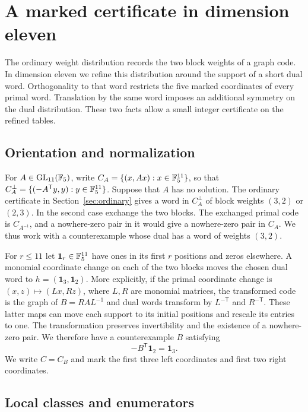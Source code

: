 \section{A marked certificate in dimension eleven}
\label{sec:marked}

The ordinary weight distribution records the two block weights of a graph code. In dimension eleven we refine this distribution around the support of a short dual word. Orthogonality to that word restricts the five marked coordinates of every primal word. Translation by the same word imposes an additional symmetry on the dual distribution. These two facts allow a small integer certificate on the refined tables.

\subsection{Orientation and normalization}

For \(A\in\operatorname{GL}_{11}(\mathbb F_5)\), write \(C_A=\{(x,Ax):x\in\mathbb F_5^{11}\}\), so that \(C_A^\perp=\{(-A^{\mathsf T}y,y):y\in\mathbb F_5^{11}\}\). Suppose that \(A\) has no solution. The ordinary certificate in Section~\ref{sec:ordinary} gives a word in \(C_A^\perp\) of block weights \((3,2)\) or \((2,3)\). In the second case exchange the two blocks. The exchanged primal code is \(C_{A^{-1}}\), and a nowhere-zero pair in it would give a nowhere-zero pair in \(C_A\). We thus work with a counterexample whose dual has a word of weights \((3,2)\).

For \(r\le 11\) let \(\mathbf 1_r\in\mathbb F_5^{11}\) have ones in its first \(r\) positions and zeros elsewhere. A monomial coordinate change on each of the two blocks moves the chosen dual word to \(h=(\mathbf 1_3,\mathbf 1_2)\). More explicitly, if the primal coordinate change is \((x,z)\mapsto(Lx,Rz)\), where \(L,R\) are monomial matrices, the transformed code is the graph of \(B=RAL^{-1}\) and dual words transform by \(L^{-\mathsf T}\) and \(R^{-\mathsf T}\). These latter maps can move each support to its initial positions and rescale its entries to one. The transformation preserves invertibility and the existence of a nowhere-zero pair. We therefore have a counterexample \(B\) satisfying
\begin{equation}\label{eq:marked-normalized}
 -B^{\mathsf T}\mathbf 1_2=\mathbf 1_3.
\end{equation}
We write \(C=C_B\) and mark the first three left coordinates and first two right coordinates.

\subsection{Local classes and enumerators}

